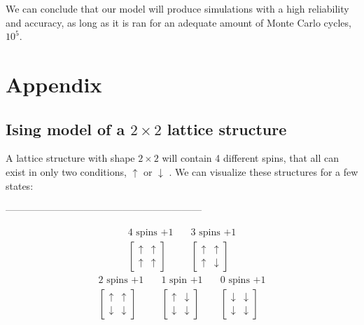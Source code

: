 \documentclass[10pt, nofootinbib, twocolumn]{revtex4-1}
\begin{document}
We can conclude that our model will produce simulations with a high reliability and accuracy, as long as it is ran for an adequate amount of Monte Carlo cycles, $10^5$. 






\cleardoublepage
\section{Appendix}\label{sec:appendix}
\subsection{Ising model of a $2\times 2$ lattice structure}\label{sec:isingmodel}
A lattice structure with shape $2\times 2$ will contain 4 different spins, that all can exist in only two conditions, $\uparrow$ or $\downarrow$ . We can visualize these structures for a few states: \\
\begin{center} ------------------------------------------------------------ \end{center}
\[\begin{array}{c}
\text{4 spins $+1$} \\
\begin{bmatrix}
\uparrow & \uparrow \\
\uparrow & \uparrow
\end{bmatrix}
\end{array}
\quad
\begin{array}{c}
\text{3 spins $+1$} \\
\begin{bmatrix}
\uparrow & \uparrow \\
\uparrow & \downarrow
\end{bmatrix}
\end{array}\]
\[\begin{array}{c}
\text{2 spins $+1$} \\
\begin{bmatrix}
\uparrow & \uparrow \\
\downarrow & \downarrow
\end{bmatrix}
\end{array}
\quad
\begin{array}{c}
\text{1 spin $+1$} \\
\begin{bmatrix}
\uparrow & \downarrow \\
\downarrow & \downarrow
\end{bmatrix}
\end{array}
\quad
\begin{array}{c}
\text{0 spins $+1$} \\
\begin{bmatrix}
\downarrow & \downarrow \\
\downarrow & \downarrow
\end{bmatrix}
\end{array}\]
\end{document}
